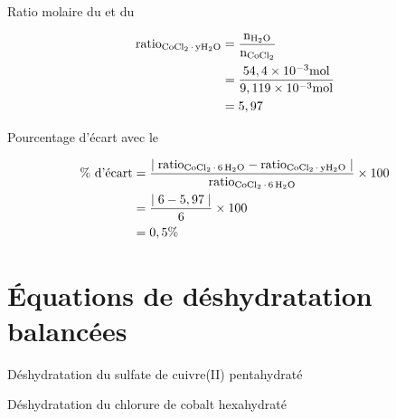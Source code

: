 \documentclass[11pt]{article}
\begin{document}
\begin{enumerate}
{\bfseries\item Ratio molaire du  et du }
\begin{equation*}
\begin{split}
\mathrm{ratio_{\ce{CoCl2.yH2O}}}&=\frac{\mathrm{n_{\ce{H2O}}}}{\mathrm{n_{\ce{CoCl2}}}}\\
	                            &=\frac{54,4\times 10^{-3}\mathrm{mol}}{9,119\times 10^{-3}\mathrm{mol}}\\
	                            &=5,97\\
\end{split}
\end{equation*}

{\bfseries\item Pourcentage d'écart avec le }
\begin{equation*}
\begin{split}
\text{\% d'écart}&=\frac{\mid\mathrm{ratio_{\ce{CoCl2.6H2O}}}-\mathrm{ratio_{\ce{CoCl2.yH2O}}}\mid}{\mathrm{ratio_{\ce{CoCl2.6H2O}}}}\times 100\\
	             &=\frac{\mid 6-5,97\mid}{6}\times 100\\
	             &=0,5\%\\
\end{split}
\end{equation*}
\end{enumerate}

\section*{Équations de déshydratation balancées}
\begin{enumerate}
{\bfseries\item Déshydratation du sulfate de cuivre(II) pentahydraté}
\begin{center}
\end{center}

{\bfseries\item Déshydratation du chlorure de cobalt hexahydraté}
\begin{center}
\end{center}
\end{enumerate}
\end{document}
